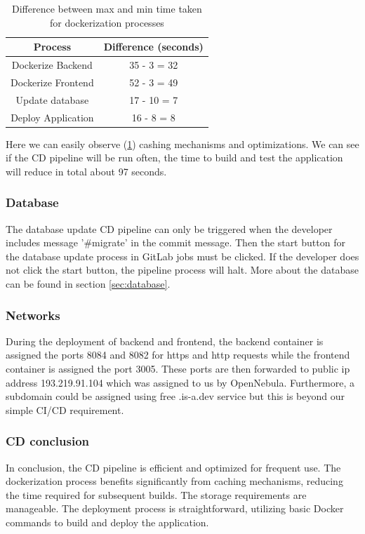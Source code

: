 \documentclass[]{VUMIFTemplateClass}
\begin{document}
\begin{table}[H]
    \centering
    \begin{tabular}{|c|c|}
        \hline
        \textbf{Process} & \textbf{Difference (seconds)} \\ 
        \hline
        Dockerize Backend & 35 - 3 = 32 \\ 
        \hline
        Dockerize Frontend & 52 - 3 = 49 \\ 
        \hline
        Update database & 17 - 10 = 7 \\
        \hline
        Deploy Application & 16 - 8 = 8 \\
        \hline
    \end{tabular}
    \caption{Difference between max and min time taken for dockerization processes}
    \label{tab:diff-dockerize-process-time}
\end{table}

Here we can easily observe (\ref{tab:diff-dockerize-process-time}) cashing mechanisms and optimizations. We can see if the CD pipeline will be run often, the time 
to build and test the application will reduce in total about 97 seconds.

\subsubsection{Database}
The database update CD pipeline can only be triggered when the developer includes message '\#migrate' in the commit message. Then the start button for the database update process in GitLab jobs must be clicked. If the developer does not click the start button, the pipeline process will halt.
More about the database can be found in section \ref{sec:database}.

\subsubsection{Networks}
During the deployment of backend and frontend, the backend container is assigned 
the ports 8084 and 8082 for https and http requests while the frontend container is 
assigned the port 3005. These ports are then forwarded to public ip address 193.219.91.104 which was assigned to us by OpenNebula.
Furthermore, a subdomain could be assigned using free .is-a.dev service but this is beyond our
simple CI/CD requirement.


\subsubsection{CD conclusion}
In conclusion, the CD pipeline is efficient and optimized for frequent use. 
The dockerization process benefits significantly from caching mechanisms, 
reducing the time required for subsequent builds. The storage requirements 
are manageable. The deployment process is straightforward, utilizing basic 
Docker commands to build and deploy the application.
\end{document}
